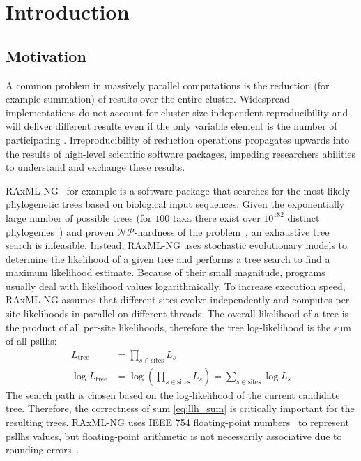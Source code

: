 \chapter{Introduction}
\label{ch:Introduction}

\section{Motivation}
\label{sec:Motivation}
A common problem in massively parallel computations is the reduction (for example summation) of results over the entire cluster.
Widespread implementations do not account for cluster-size-independent reproducibility and will deliver different results
even if the only variable element is the number of participating .
Irreproducibility of reduction operations propagates upwards into the results of high-level scientific software packages, impeding researchers abilities to understand and exchange these results.

RAxML-NG~\cite{kozlov_raxml-ng_2019} for example is a software package that searches for the most likely phylogenetic trees based on biological input sequences.
Given the exponentially large number of possible trees (for $100$ taxa there exist over $10^{182}$ distinct phylogenies~\cite{stamatakis_efficient_2020}) and proven $\mathcal{NP}$-hardness of the problem~\cite{roch_short_2006}, an exhaustive tree search is infeasible.
Instead, RAxML-NG uses stochastic evolutionary models to determine the likelihood of a given tree and performs a tree search to find a maximum likelihood estimate.
Because of their small magnitude, programs usually deal with likelihood values logarithmically.
To increase execution speed, RAxML-NG assumes that different sites evolve independently and computes per-site likelihoods in parallel on different threads.
The overall likelihood of a tree is the product of all per-site likelihoods, therefore the tree log-likelihood is the sum of all \glspl{psllh}:
\begin{align}
L_{\textrm{tree}} &= \prod_{s \in \textrm{sites}} L_s \\
\label{eq:llh_sum}
\log L_{\textrm{tree}} &= \log \left(\prod_{s \in \textrm{sites}} L_s\right) = \sum_{s \in \textrm{sites}}  \log L_s
\end{align}
The search path is chosen based on the log-likelihood of the current candidate tree.
Therefore, the correctness of sum \eqref{eq:llh_sum} is critically important for the resulting trees.
RAxML-NG uses IEEE 754 floating-point numbers~\cite{noauthor_ieee_nodate} to represent \glspl{psllh} values, but floating-point arithmetic is not necessarily associative due to rounding errors~\cite{goldberg_what_1991}.


